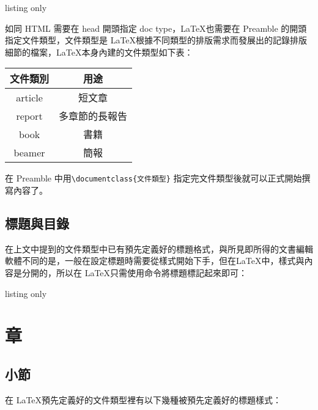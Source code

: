 \begin{tcblisting}{listing only}


\end{tcblisting}

如同 HTML 需要在 head 開頭指定 doc type，\LaTeX 也需要在 Preamble 的開頭指定文件類型，文件類型是 \LaTeX 根據不同類型的排版需求而發展出的記錄排版細節的檔案，\LaTeX 本身內建的文件類型如下表：

\begin{tabular}{cc}
\hline
文件類別 & 用途 \\\hline\hline
article & 短文章 \\\hline
report & 多章節的長報告 \\\hline
book & 書籍 \\\hline
beamer & 簡報 \\\hline
\end{tabular}

在 Preamble 中用\verb|\documentclass{文件類型}| 指定完文件類型後就可以正式開始撰寫內容了。

\section{標題與目錄}

在上文中提到的文件類型中已有預先定義好的標題格式，與所見即所得的文書編輯軟體不同的是，一般在設定標題時需要從樣式開始下手，但在\LaTeX 中，樣式與內容是分開的，所以在 \LaTeX 只需使用命令將標題標記起來即可：

\begin{tcblisting}{listing only}
\chapter{章}
\section{小節}
\end{tcblisting}

在 \LaTeX 預先定義好的文件類型裡有以下幾種被預先定義好的標題樣式：

